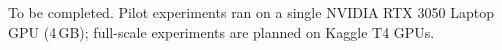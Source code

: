 \documentclass[
  aps,
  pra,
  reprint,
  superscriptaddress,
  longbibliography,
  nofootinbib
]{revtex4-2}
\begin{document}








\begin{acknowledgments}
To be completed. Pilot experiments ran on a single NVIDIA RTX 3050 Laptop GPU (4\,GB); full-scale experiments are planned on Kaggle T4 GPUs.
\end{acknowledgments}





\end{document}

